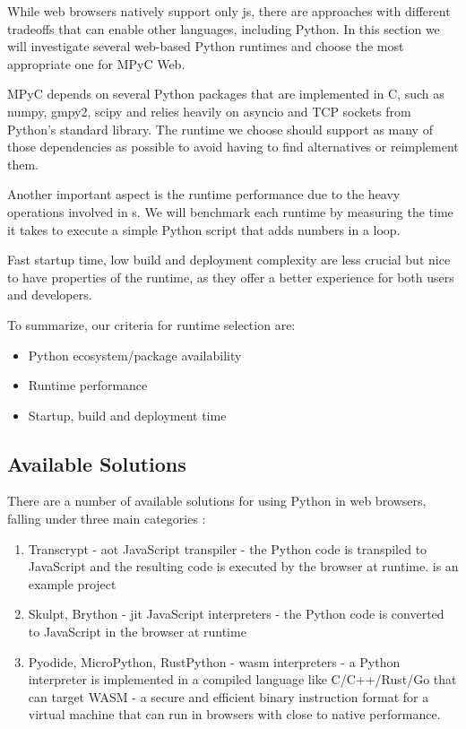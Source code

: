 While web browsers natively support only \gls{js}, there are approaches with different tradeoffs that can enable other languages, including Python. In this section we will investigate several web-based Python runtimes and choose the most appropriate one for MPyC Web.

MPyC depends on several Python packages that are implemented in C, such as numpy, gmpy2, scipy and relies heavily on asyncio and TCP sockets from Python's standard library. The runtime we choose should support as many of those dependencies as possible to avoid having to find alternatives or reimplement them.

Another important aspect is the runtime performance due to the heavy operations involved in s. We will benchmark each runtime by measuring the time it takes to execute a simple Python script that adds numbers in a loop.

Fast startup time, low build and deployment complexity are less crucial but nice to have properties of the runtime, as they offer a better experience for both users and developers.

To summarize, our criteria for runtime selection are:

\begin{itemize}
\tightlist
\item
  Python ecosystem/package availability
\item
  Runtime performance
\item
  Startup, build and deployment time
\end{itemize}

\subsection{Available Solutions}\label{thesis__090-mpyc-web.md__available-solutions}

There are a number of available solutions for using Python in web browsers, falling under three main categories\autocite{pyodideIntroMozilla} \autocite{anvilPythonBrowser}:

\begin{enumerate}
\def\labelenumi{\arabic{enumi}.}
\tightlist
\item
  Transcrypt\autocite{transcryptRepo} - \gls{aot} JavaScript transpiler - the Python code is transpiled to JavaScript and the resulting code is executed by the browser at runtime. is an example project
\item
  Skulpt\autocite{skulptDocs}, Brython\autocite{brythonDocs} - \gls{jit} JavaScript interpreters - the Python code is converted to JavaScript in the browser at runtime
\item
  Pyodide\autocite{pyodideDocs}, MicroPython\autocite{microPythonDocs}, RustPython\autocite{rustPythonDocs} - \gls{wasm}\autocite{wasmDocs} interpreters - a Python interpreter is implemented in a compiled language like C/C++/Rust/Go that can target WASM - a secure and efficient binary instruction format for a virtual machine that can run in browsers with close to native performance.
\end{enumerate}

